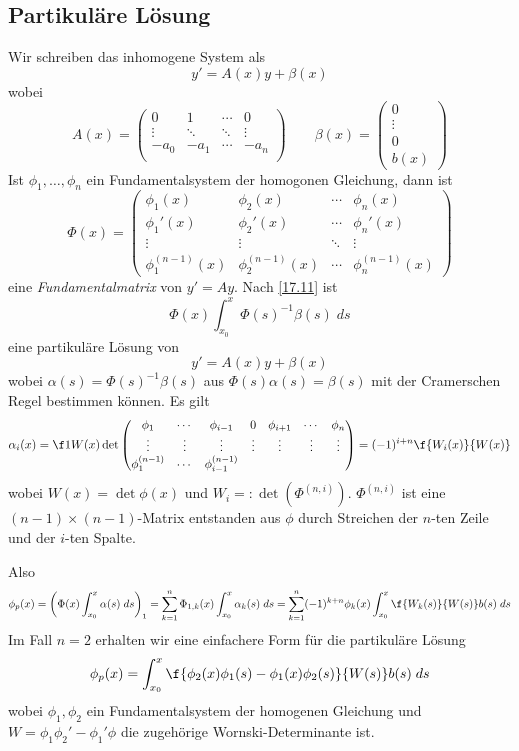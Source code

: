 \documentclass[a4paper,10pt]{scrbook}
\begin{document}
\subsection{Partikuläre Lösung}

Wir schreiben das inhomogene System als
\[
	y' = A(x)y + \beta(x)
\]
wobei
\[
	A(x) = \begin{pmatrix}
		0 & 1 & \cdots & 0 \\
		\vdots & \ddots & \ddots & \vdots \\
		-a_0 & -a_1 & \cdots & -a_n\\
	\end{pmatrix} \qquad \beta(x) = \begin{pmatrix} 0\\\vdots \\ 0\\ b(x)\end{pmatrix}
\]
Ist $\phi_1,\dotsc, \phi_n$ ein Fundamentalsystem der homogonen Gleichung, dann ist
			\[
				\Phi(x) = \begin{pmatrix}\phi_1(x) & \phi_2(x) & \cdots & \phi_n(x)\\
				\phi_1'(x) & \phi_2'(x) & \cdots & \phi_n'(x)\\
				\vdots & \vdots & \ddots & \vdots\\
				\phi_1^{(n-1)}(x) & \phi_2^{(n-1)}(x) & \cdots & \phi_n^{(n-1)}(x)
				\end{pmatrix}
			\]
eine \emph{Fundamentalmatrix} von $y'=Ay$.
Nach \ref{17.11} ist
\[
	\Phi(x) \int_{x_0}^x \Phi(s)^{-1}\beta(s) \; ds
\]
eine partikuläre Lösung von
\[
	y' = A(x)y + \beta(x)
\]
wobei $\alpha(s) = \Phi(s)^{-1}\beta(s)$ aus $\Phi(s)\alpha(s) = \beta(s)$ mit der Cramerschen Regel bestimmen können.
Es gilt
\[
	\alpha_i(x) = \f 1{W(x)} \det \begin{pmatrix} 
		\phi_1 & \cdots & \phi_{i-1} & 0 & \phi_{i+1} & \cdots & \phi_n\\
		\vdots & \vdots & \vdots & \vdots & \vdots & \vdots & \vdots\\
		\phi_1^{(n-1)} & \cdots & \phi_{i-1}^{(n-1)}
	\end{pmatrix}
	= (-1)^{i+n}\f{W_i(x)}{W(x)}
\]
wobei $W(x) = \det \phi(x)$ und $W_i =: \det (\Phi^{(n,i)})$.
$\Phi^{(n,i)}$ ist eine $(n-1)\times(n-1)$-Matrix entstanden aus $\phi$ durch Streichen der $n$-ten Zeile und der $i$-ten Spalte.

Also
\[
	\phi_p(x) = \left(\Phi(x) \int_{x_0}^x \alpha(s) \; ds\right)_1 = \sum_{k=1}^n \Phi_{1,k}(x) \int_{x_0}^x \alpha_k(s) \; ds = \sum_{k=1}^n (-1)^{k+n}\phi_k(x) \int_{x_0}^x \f{W_k(s)}{W(s)}b(s) \; ds
\]
Im Fall $n=2$ erhalten wir eine einfachere Form für die partikuläre Lösung
\[
	\phi_p(x) = \int_{x_0}^x \f{\phi_2(x)\phi_1(s) - \phi_1(x) \phi_2(s)}{W(s)}b(s) \; ds
\]
wobei $\phi_1,\phi_2$ ein Fundamentalsystem der homogenen Gleichung und $W=\phi_1\phi_2' - \phi_1'\phi$ die zugehörige Wornski-Determinante ist.
\end{document}
